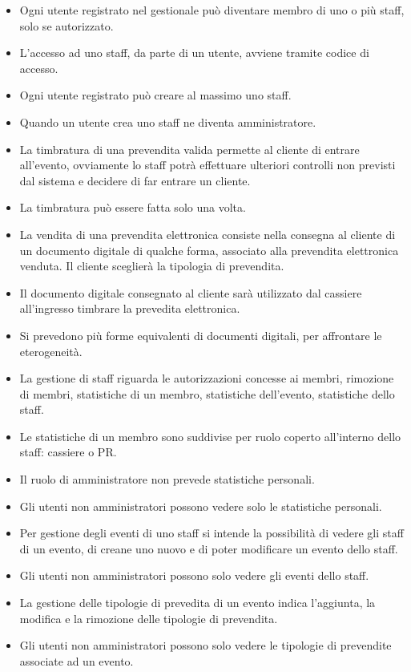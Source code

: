 \documentclass{article}
\begin{document}
\begin{itemize}
    \item Ogni utente registrato nel gestionale può diventare membro di uno o più staff, solo se autorizzato. 
    \item L'accesso ad uno staff, da parte di un utente, avviene tramite codice di accesso.
    \item Ogni utente registrato può creare al massimo uno staff.
    \item Quando un utente crea uno staff ne diventa amministratore.
    
    
    
    
    \item La timbratura di una prevendita valida permette al cliente di entrare all'evento, ovviamente lo staff potrà effettuare ulteriori controlli non previsti dal sistema e decidere di far entrare un cliente.
    \item La timbratura può essere fatta solo una volta.
    
    \item La vendita di una prevendita elettronica consiste nella consegna al cliente di un documento digitale di qualche forma, associato alla prevendita elettronica venduta. Il cliente sceglierà la tipologia di prevendita.
    \item Il documento digitale consegnato al cliente sarà utilizzato dal cassiere all'ingresso timbrare la prevedita elettronica.
    \item Si prevedono più forme equivalenti di documenti digitali, per affrontare le eterogeneità.
    
    
    \item La gestione di staff riguarda le autorizzazioni concesse ai membri, rimozione di membri, statistiche di un membro, statistiche dell'evento, statistiche dello staff.
    
    \item Le statistiche di un membro sono suddivise per ruolo coperto all'interno dello staff: cassiere o PR.
    \item Il ruolo di amministratore non prevede statistiche personali.
    \item Gli utenti non amministratori possono vedere solo le statistiche personali.
    
    \item Per gestione degli eventi di uno staff si intende la possibilità di vedere gli staff di un evento, di creane uno nuovo e di poter modificare un evento dello staff.
    \item Gli utenti non amministratori possono solo vedere gli eventi dello staff.
    \item La gestione delle tipologie di prevedita di un evento indica l'aggiunta, la modifica e la rimozione delle tipologie di prevendita.
    \item Gli utenti non amministratori possono solo vedere le tipologie di prevendite associate ad un evento.
    

\end{itemize}
\end{document}

